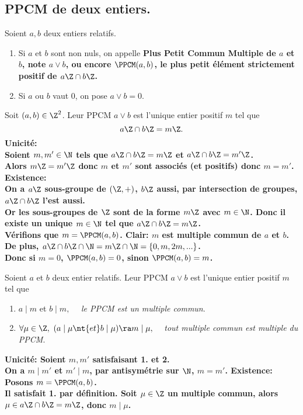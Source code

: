\documentclass[11pt]{article}
\begin{document}
\subsection{PPCM de deux entiers.}

\begin{defi}{}{}
    Soient $a,b$ deux entiers relatifs.
    \begin{enumerate}[topsep=0pt,itemsep=-0.9 ex]
        \item Si $a$ et $b$ sont non nuls, on appelle \bf{Plus Petit Commun Multiple} de $a$ et $b$, note $a\lor b$, ou encore $\PPCM(a,b)$, le plus petit élément strictement positif de $a\Z\cap b\Z$.
        \item Si $a$ ou $b$ vaut 0, on pose $a\lor b=0$.
    \end{enumerate}
\end{defi}

\begin{prop}{}{}
    Soit $(a,b)\in\Z^2$. Leur PPCM $a\lor b$ est l'unique entier positif $m$ tel que
    \begin{equation*}
        a\Z \cap b\Z = m\Z.
    \end{equation*}
    \tcblower
    \bf{Unicité:}\\
    Soient $m,m'\in\N$ tels que $a\Z\cap b\Z=m\Z$ et $a\Z\cap b\Z=m'\Z$.\\
    Alors $m\Z = m'\Z$ donc $m$ et $m'$ sont associés (et positifs) donc $m=m'$.\n
    \bf{Existence:}\\
    On a $a\Z$ sous-groupe de $(\Z,+)$, $b\Z$ aussi, par intersection de groupes, $a\Z\cap b\Z$ l'est aussi.\\
    Or les sous-groupes de $\Z$ sont de la forme $m\Z$ avec $m\in\N$. Donc il existe un unique $m\in\N$ tel que $a\Z\cap b\Z=m\Z$.\\
    Vérifions que $m=\PPCM(a,b)$. Clair: $m$ est multiple commun de $a$ et $b$.\\
    De plus, $a\Z\cap b\Z\cap\N=m\Z\cap\N=\{0,m,2m,...\}$.\\
    Donc si $m=0$, $\PPCM(a,b)=0$, sinon $\PPCM(a,b)=m$. 
\end{prop}

\begin{thm}{}{}
    Soient $a$ et $b$ deux entier relatifs. Leur PPCM $a\lor b$ est l'unique entier positif $m$ tel que
    \begin{enumerate}[topsep=0pt,itemsep=-0.9 ex]
        \item $a\mid m$ et $b\mid m,\quad$ \emph{le PPCM est un multiple commun}.
        \item $\forall \mu \in \Z,~(a\mid\mu \nt{ et } b \mid \mu) \ra m \mid \mu,\quad$ \emph{tout multiple commun est multiple du PPCM}.
    \end{enumerate}
    \tcblower
    \bf{Unicité:} Soient $m,m'$ satisfaisant 1. et 2.\\
    On a $m\mid m'$ et $m'\mid m$, par antisymétrie sur $\N$, $m=m'$.\n
    \bf{Existence:} Posons $m=\PPCM(a,b)$.\\
    Il satisfait 1. par définition. Soit $\mu\in\Z$ un multiple commun, alors $\mu\in a\Z\cap b\Z=m\Z$, donc $m\mid \mu$.
\end{thm}
\end{document}
